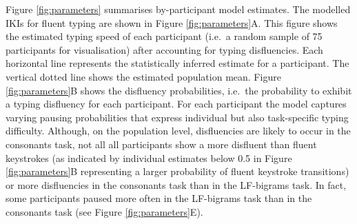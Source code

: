\documentclass[
  english,
  man,mask,floatsintext]{apa7}
\begin{document}
Figure \ref{fig:parameters} summarises by-participant model estimates. The modelled IKIs for fluent typing are shown in Figure \ref{fig:parameters}A. This figure shows the estimated typing speed of each participant (i.e.~a random sample of 75 participants for visualisation) after accounting for typing disfluencies. Each horizontal line represents the statistically inferred estimate for a participant. The vertical dotted line shows the estimated population mean. Figure \ref{fig:parameters}B shows the disfluency probabilities, i.e.~the probability to exhibit a typing disfluency for each participant. For each participant the model captures varying pausing probabilities that express individual but also task-specific typing difficulty. Although, on the population level, disfluencies are likely to occur in the consonants task, not all all participants show a more disfluent than fluent keystrokes (as indicated by individual estimates below 0.5 in Figure \ref{fig:parameters}B representing a larger probability of fluent keystroke transitions) or more disfluencies in the consonants task than in the LF-bigrams task. In fact, some participants paused more often in the LF-bigrams task than in the consonants task (see Figure \ref{fig:parameters}E).
\end{document}
